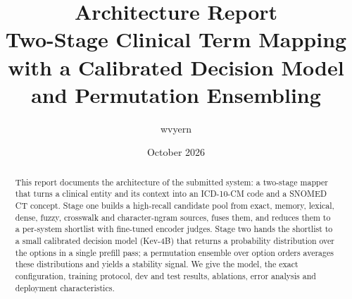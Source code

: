\documentclass[11pt]{article}
\title{\textbf{Architecture Report}\\[2pt]
\large Two-Stage Clinical Term Mapping with a Calibrated Decision Model\\
and Permutation Ensembling}
\author{wvyern}
\date{October 2026}
\begin{document}
\maketitle

\begin{abstract}
This report documents the architecture of the submitted system: a two-stage mapper that
turns a clinical entity and its context into an ICD-10-CM code and a SNOMED CT concept.
Stage one builds a high-recall candidate pool from exact, memory, lexical, dense, fuzzy,
crosswalk and character-ngram sources, fuses them, and reduces them to a per-system
shortlist with fine-tuned encoder judges. Stage two hands the shortlist to a small
calibrated decision model (Kev-4B) that returns a probability distribution over the
options in a single prefill pass; a permutation ensemble over option orders averages these
distributions and yields a stability signal. We give the model, the exact configuration,
training protocol, dev and test results, ablations, error analysis and deployment
characteristics.
\end{abstract}
\end{document}
